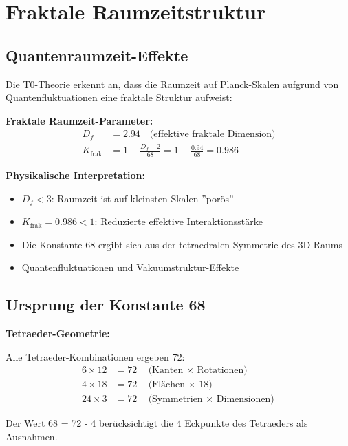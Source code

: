 \documentclass[12pt,a4paper]{article}
\newcommand{\Kfrak}{K_{\text{frak}}}
\newcommand{\Dfrak}{D_f}
\begin{document}
	\section{Fraktale Raumzeitstruktur}
	
	\subsection{Quantenraumzeit-Effekte}
	
	Die T0-Theorie erkennt an, dass die Raumzeit auf Planck-Skalen aufgrund von Quantenfluktuationen eine fraktale Struktur aufweist:
	
	\begin{keyresult}
		\textbf{Fraktale Raumzeit-Parameter:}
		\begin{align}
			\Dfrak &= 2.94 \quad \text{(effektive fraktale Dimension)} \\
			\Kfrak &= 1 - \frac{\Dfrak - 2}{68} = 1 - \frac{0.94}{68} = 0.986
		\end{align}
		
		\textbf{Physikalische Interpretation:}
		\begin{itemize}
			\item $\Dfrak < 3$: Raumzeit ist auf kleinsten Skalen ''porös''
			\item $\Kfrak = 0.986 < 1$: Reduzierte effektive Interaktionsstärke
			\item Die Konstante 68 ergibt sich aus der tetraedralen Symmetrie des 3D-Raums
			\item Quantenfluktuationen und Vakuumstruktur-Effekte
		\end{itemize}
	\end{keyresult}
	
	\subsection{Ursprung der Konstante 68}
	
	\begin{alternative}
		\textbf{Tetraeder-Geometrie:}
		
		Alle Tetraeder-Kombinationen ergeben 72:
		\begin{align}
			6 \times 12 &= 72 \quad \text{(Kanten $\times$ Rotationen)} \\
			4 \times 18 &= 72 \quad \text{(Flächen $\times$ 18)} \\
			24 \times 3 &= 72 \quad \text{(Symmetrien $\times$ Dimensionen)}
		\end{align}
		
		Der Wert 68 = 72 - 4 berücksichtigt die 4 Eckpunkte des Tetraeders als Ausnahmen.
	\end{alternative}
\end{document}
